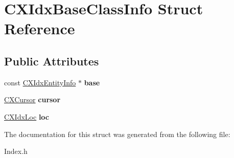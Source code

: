 \hypertarget{structCXIdxBaseClassInfo}{}\section{C\+X\+Idx\+Base\+Class\+Info Struct Reference}
\label{structCXIdxBaseClassInfo}
\subsection*{Public Attributes}
\begin{DoxyCompactItemize}
\item 
\mbox{\label{structCXIdxBaseClassInfo_a5cff665cfaf9373767770fb22455bed9}} 
const \mbox{\hyperlink{structCXIdxEntityInfo}{C\+X\+Idx\+Entity\+Info}} $\ast$ {\bfseries base}
\item 
\mbox{\label{structCXIdxBaseClassInfo_a6cfdb0b1f7f50131ab1ef4d2259fcd30}} 
\mbox{\hyperlink{structCXCursor}{C\+X\+Cursor}} {\bfseries cursor}
\item 
\mbox{\label{structCXIdxBaseClassInfo_a93006e043cbcb21883be8de1a1335026}} 
\mbox{\hyperlink{structCXIdxLoc}{C\+X\+Idx\+Loc}} {\bfseries loc}
\end{DoxyCompactItemize}


The documentation for this struct was generated from the following file\+:\begin{DoxyCompactItemize}
\item 
Index.\+h\end{DoxyCompactItemize}
